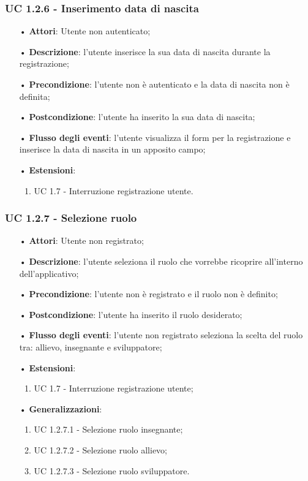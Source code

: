 \subsubsection{UC 1.2.6 - Inserimento data di nascita}
\begin{itemize}
	\item[•]\textbf{Attori}: Utente non autenticato;
	\item[•]\textbf{Descrizione}: l'utente inserisce la sua data di nascita durante la registrazione;
	\item[•]\textbf{Precondizione}: l'utente non è autenticato e la data di nascita non è definita;
	\item[•]\textbf{Postcondizione}: l'utente ha inserito la sua data di nascita;
	\item[•]\textbf{Flusso degli eventi}: l'utente visualizza il form per la registrazione e inserisce la data di nascita in un apposito campo;
	\item[•]\textbf{Estensioni}:
	\begin{enumerate}
		\item UC 1.7 - Interruzione registrazione utente.
	\end{enumerate}
\end{itemize}

\subsubsection{UC 1.2.7 - Selezione ruolo}
\begin{itemize}
	\item[•]\textbf{Attori}: Utente non registrato;
	\item[•]\textbf{Descrizione}: l'utente seleziona il ruolo che vorrebbe ricoprire all'interno dell'applicativo;
	\item[•]\textbf{Precondizione}: l'utente non è registrato e il ruolo non è definito;
	\item[•]\textbf{Postcondizione}: l'utente ha inserito il ruolo desiderato;
	\item[•]\textbf{Flusso degli eventi}: l'utente non registrato seleziona la scelta del ruolo tra: allievo, insegnante e sviluppatore;
	\item[•]\textbf{Estensioni}:
	\begin{enumerate}
		\item UC 1.7 - Interruzione registrazione utente;
	\end{enumerate}
	\item[•]\textbf{Generalizzazioni}: 
	\begin{enumerate}
		\item UC 1.2.7.1 - Selezione ruolo insegnante;
		\item UC 1.2.7.2 - Selezione ruolo allievo;
		\item UC 1.2.7.3 - Selezione ruolo sviluppatore.
	\end{enumerate}
\end{itemize}

